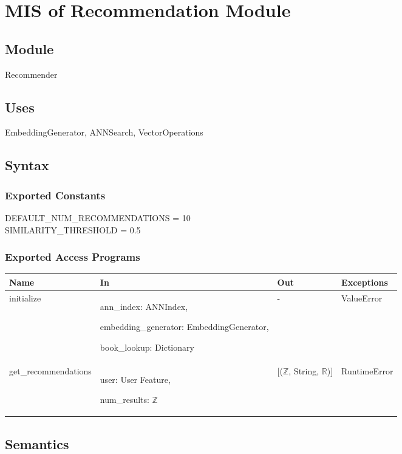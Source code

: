 \documentclass[12pt, titlepage]{article}
\begin{document}
\newpage

\section{MIS of Recommendation Module } \label{ModuleR}

\subsection{Module}

Recommender

\subsection{Uses}
EmbeddingGenerator, ANNSearch, VectorOperations

\subsection{Syntax}

\subsubsection{Exported Constants}
DEFAULT\_NUM\_RECOMMENDATIONS = 10\\
SIMILARITY\_THRESHOLD = 0.5
\subsubsection{Exported Access Programs}

\begin{center}
  \begin{tabular}{p{5cm} p{4cm} p{4cm} p{2cm}}
  \hline
  \textbf{Name} & \textbf{In} & \textbf{Out} & \textbf{Exceptions} \\
  \hline
  initialize & ann\_index: ANNIndex,
  
  embedding\_generator: EmbeddingGenerator,
  
  book\_lookup: Dictionary & -& ValueError \\
  \hline
  get\_recommendations & user: User Feature,
  
  num\_results: $\mathbb{Z}$ & [($\mathbb{Z}$, String, $\mathbb{R}$)] & RuntimeError \\
  \hline
  \end{tabular}
  \end{center}

\subsection{Semantics}
\end{document}
